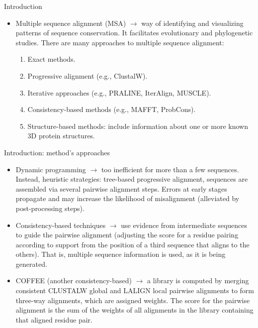 \begin{frame}{Introduction}

    \begin{itemize}
        \item Multiple sequence alignment (MSA) $\rightarrow$ way of identifying and visualizing patterns of sequence conservation. It facilitates evolutionary and phylogenetic studies. There are many approaches to multiple sequence alignment:
        \begin{enumerate}
            \item Exact methods.
            \item Progressive alignment (e.g., ClustalW).
            \item Iterative approaches (e.g., PRALINE, IterAlign, MUSCLE).
            \item Consistency-based methods (e.g., MAFFT, ProbCons).
            \item Structure-based methods: include information about one or more known 3D protein structures.
        \end{enumerate}
    \end{itemize}
    
\end{frame}

\begin{frame}{Introduction: method's approaches}

    \begin{itemize}
        \item Dynamic programming $\rightarrow$ too inefficient for more than a few sequences. Instead, heuristic strategies: tree-based progressive alignment, sequences are assembled via several pairwise alignment steps. Errors at early stages propagate and may increase the likelihood of misalignment (alleviated by post-processing steps).
        \item Consistency-based techniques $\rightarrow$ use evidence from intermediate sequences to guide the pairwise alignment (adjusting the score for a residue pairing according to support from the position of a third sequence that aligns to the others). That is, multiple sequence information is used, as it is being generated.
        \item COFFEE (another consistency-based) $\rightarrow$ a library is computed by merging consistent CLUSTALW global and LALIGN local pairwise alignments to form three-way alignments, which are assigned weights. The score for the pairwise alignment is the sum of the weights of all alignments in the library containing that aligned residue pair.
    \end{itemize}

\end{frame}